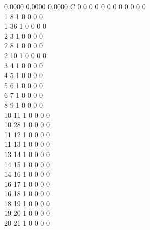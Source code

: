 \documentclass[11pt,titlepage,dvipdfmx,twoside]{article}
\begin{document}
\begin{oframed}
{    0.0000    0.0000    0.0000  C  0  0  0  0  0  0  0  0  0  0  0  0   \\
  1  8  1  0  0  0  0                                                   \\
  1 36  1  0  0  0  0                                                   \\
  2  3  1  0  0  0  0                                                   \\
  2  8  1  0  0  0  0                                                   \\
  2 10  1  0  0  0  0                                                   \\
  3  4  1  0  0  0  0                                                   \\
  4  5  1  0  0  0  0                                                   \\
  5  6  1  0  0  0  0                                                   \\
  6  7  1  0  0  0  0                                                   \\
  8  9  1  0  0  0  0                                                   \\
 10 11  1  0  0  0  0                                                   \\
 10 28  1  0  0  0  0                                                   \\
 11 12  1  0  0  0  0                                                   \\
 11 13  1  0  0  0  0                                                   \\
 13 14  1  0  0  0  0                                                   \\
 14 15  1  0  0  0  0                                                   \\
 14 16  1  0  0  0  0                                                   \\
 16 17  1  0  0  0  0                                                   \\
 16 18  1  0  0  0  0                                                   \\
 18 19  1  0  0  0  0                                                   \\
 19 20  1  0  0  0  0                                                   \\
 20 21  1  0  0  0  0                                                   \\
}
\end{oframed}
\end{document}
